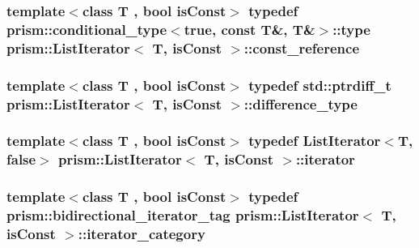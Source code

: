 \subsubsection[{\texorpdfstring{const\+\_\+reference}{const_reference}}]{\setlength{\rightskip}{0pt plus 5cm}template$<$class T , bool is\+Const$>$ typedef {\bf prism\+::conditional\+\_\+type}$<$true, const T\&, T\&$>$\+::type {\bf prism\+::\+List\+Iterator}$<$ T, is\+Const $>$\+::{\bf const\+\_\+reference}}\hypertarget{structprism_1_1_list_iterator_a81228a805df7388c2eb9e6500a36ee34}{}\label{structprism_1_1_list_iterator_a81228a805df7388c2eb9e6500a36ee34}
\subsubsection[{\texorpdfstring{difference\+\_\+type}{difference_type}}]{\setlength{\rightskip}{0pt plus 5cm}template$<$class T , bool is\+Const$>$ typedef std\+::ptrdiff\+\_\+t {\bf prism\+::\+List\+Iterator}$<$ T, is\+Const $>$\+::{\bf difference\+\_\+type}}\hypertarget{structprism_1_1_list_iterator_a81d24e551a1b9ef7397d37b7d92511cf}{}\label{structprism_1_1_list_iterator_a81d24e551a1b9ef7397d37b7d92511cf}
\subsubsection[{\texorpdfstring{iterator}{iterator}}]{\setlength{\rightskip}{0pt plus 5cm}template$<$class T , bool is\+Const$>$ typedef {\bf List\+Iterator}$<$T, false$>$ {\bf prism\+::\+List\+Iterator}$<$ T, is\+Const $>$\+::{\bf iterator}}\hypertarget{structprism_1_1_list_iterator_a91ccdd8512cbc8314d784e39ed4597dd}{}\label{structprism_1_1_list_iterator_a91ccdd8512cbc8314d784e39ed4597dd}
\subsubsection[{\texorpdfstring{iterator\+\_\+category}{iterator_category}}]{\setlength{\rightskip}{0pt plus 5cm}template$<$class T , bool is\+Const$>$ typedef {\bf prism\+::bidirectional\+\_\+iterator\+\_\+tag} {\bf prism\+::\+List\+Iterator}$<$ T, is\+Const $>$\+::{\bf iterator\+\_\+category}}\hypertarget{structprism_1_1_list_iterator_ae5286e35b86909c6990d328423bf3641}{}\label{structprism_1_1_list_iterator_ae5286e35b86909c6990d328423bf3641}
